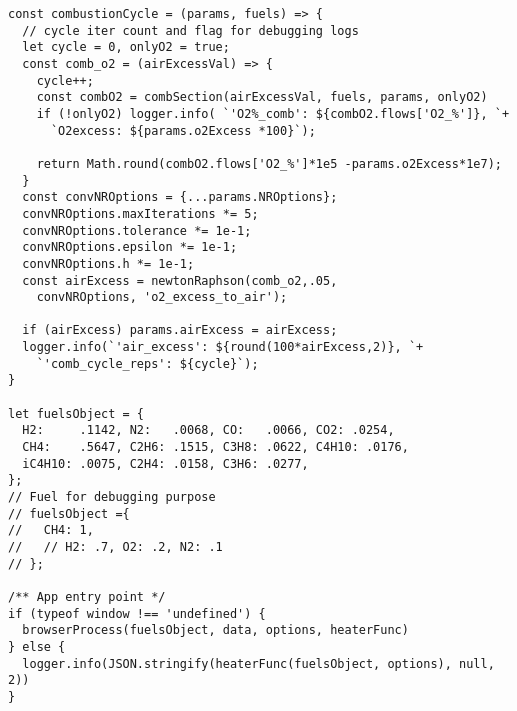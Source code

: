 \begin{verbatim}
const combustionCycle = (params, fuels) => {
  // cycle iter count and flag for debugging logs 
  let cycle = 0, onlyO2 = true;
  const comb_o2 = (airExcessVal) => {
    cycle++;
    const combO2 = combSection(airExcessVal, fuels, params, onlyO2)
    if (!onlyO2) logger.info( `'O2%_comb': ${combO2.flows['O2_%']}, `+
      `O2excess: ${params.o2Excess *100}`);

    return Math.round(combO2.flows['O2_%']*1e5 -params.o2Excess*1e7);
  }
  const convNROptions = {...params.NROptions};
  convNROptions.maxIterations *= 5;
  convNROptions.tolerance *= 1e-1;
  convNROptions.epsilon *= 1e-1;
  convNROptions.h *= 1e-1;
  const airExcess = newtonRaphson(comb_o2,.05,
    convNROptions, 'o2_excess_to_air');

  if (airExcess) params.airExcess = airExcess;
  logger.info(`'air_excess': ${round(100*airExcess,2)}, `+
    `'comb_cycle_reps': ${cycle}`);
}

let fuelsObject = { 
  H2:     .1142, N2:   .0068, CO:   .0066, CO2: .0254, 
  CH4:    .5647, C2H6: .1515, C3H8: .0622, C4H10: .0176, 
  iC4H10: .0075, C2H4: .0158, C3H6: .0277,
};
// Fuel for debugging purpose
// fuelsObject ={
//   CH4: 1,
//   // H2: .7, O2: .2, N2: .1
// };

/** App entry point */
if (typeof window !== 'undefined') {
  browserProcess(fuelsObject, data, options, heaterFunc)
} else {
  logger.info(JSON.stringify(heaterFunc(fuelsObject, options), null, 2))
}
\end{verbatim}


